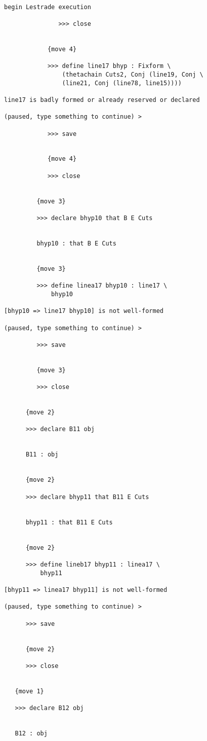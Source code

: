 \documentclass[12pt]{article}
\begin{document}
\begin{verbatim}

begin Lestrade execution

               >>> close


            {move 4}

            >>> define line17 bhyp : Fixform \
                (thetachain Cuts2, Conj (line19, Conj \
                (line21, Conj (line78, line15))))

line17 is badly formed or already reserved or declared

(paused, type something to continue) >

            >>> save


            {move 4}

            >>> close


         {move 3}

         >>> declare bhyp10 that B E Cuts


         bhyp10 : that B E Cuts


         {move 3}

         >>> define linea17 bhyp10 : line17 \
             bhyp10

[bhyp10 => line17 bhyp10] is not well-formed

(paused, type something to continue) >

         >>> save


         {move 3}

         >>> close


      {move 2}

      >>> declare B11 obj


      B11 : obj


      {move 2}

      >>> declare bhyp11 that B11 E Cuts


      bhyp11 : that B11 E Cuts


      {move 2}

      >>> define lineb17 bhyp11 : linea17 \
          bhyp11

[bhyp11 => linea17 bhyp11] is not well-formed

(paused, type something to continue) >

      >>> save


      {move 2}

      >>> close


   {move 1}

   >>> declare B12 obj


   B12 : obj



\end{verbatim}
\end{document}
